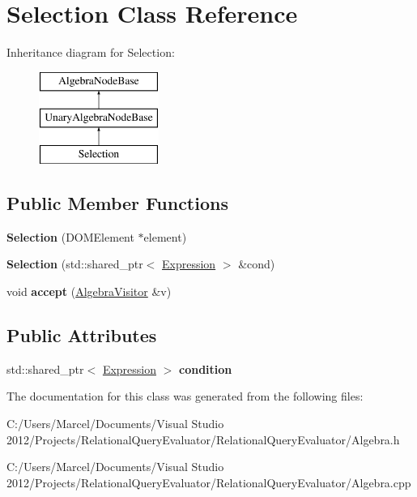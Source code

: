 \hypertarget{class_selection}{\section{Selection Class Reference}
\label{class_selection}
}
Inheritance diagram for Selection\+:\begin{figure}[H]
\begin{center}
\leavevmode
\includegraphics[height=3.000000cm]{class_selection}
\end{center}
\end{figure}
\subsection*{Public Member Functions}
\begin{DoxyCompactItemize}
\item 
\hypertarget{class_selection_a83b3073a2d490708256e3dc725560836}{{\bfseries Selection} (D\+O\+M\+Element $\ast$element)}\label{class_selection_a83b3073a2d490708256e3dc725560836}

\item 
\hypertarget{class_selection_a086ad5ebceb2f48c7b66c150c4f1d92c}{{\bfseries Selection} (std\+::shared\+\_\+ptr$<$ \hyperlink{class_expression}{Expression} $>$ \&cond)}\label{class_selection_a086ad5ebceb2f48c7b66c150c4f1d92c}

\item 
\hypertarget{class_selection_afe7f64aed777d583797f1c9c13b378ac}{void {\bfseries accept} (\hyperlink{class_algebra_visitor}{Algebra\+Visitor} \&v)}\label{class_selection_afe7f64aed777d583797f1c9c13b378ac}

\end{DoxyCompactItemize}
\subsection*{Public Attributes}
\begin{DoxyCompactItemize}
\item 
\hypertarget{class_selection_a2356634cb924e5b5814c4d2bfee51d65}{std\+::shared\+\_\+ptr$<$ \hyperlink{class_expression}{Expression} $>$ {\bfseries condition}}\label{class_selection_a2356634cb924e5b5814c4d2bfee51d65}

\end{DoxyCompactItemize}


The documentation for this class was generated from the following files\+:\begin{DoxyCompactItemize}
\item 
C\+:/\+Users/\+Marcel/\+Documents/\+Visual Studio 2012/\+Projects/\+Relational\+Query\+Evaluator/\+Relational\+Query\+Evaluator/Algebra.\+h\item 
C\+:/\+Users/\+Marcel/\+Documents/\+Visual Studio 2012/\+Projects/\+Relational\+Query\+Evaluator/\+Relational\+Query\+Evaluator/Algebra.\+cpp\end{DoxyCompactItemize}
